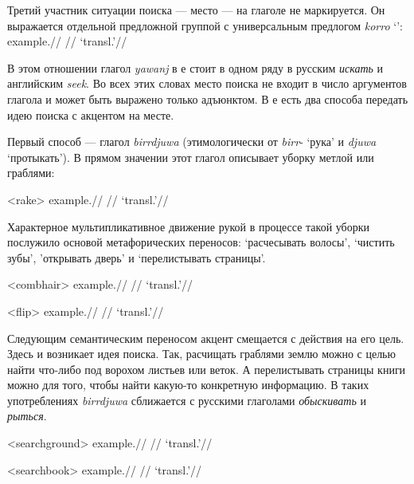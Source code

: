 
Третий участник ситуации поиска --- место --- на глаголе не маркируется. Он выражается отдельной предложной группой с универсальным предлогом \textit{korro} `\korro':
\begingl
\gla example.//
\glb //
\glft `transl.'\trailingcitation{[src]}//
\endgl\xe

В этом отношении глагол \textit{yawanj} в  е стоит в одном ряду в русским \textit{искать} и английским \textit{seek}. Во всех этих словах место поиска не входит в число аргументов глагола и может быть выражено только адъюнктом. В  е есть два способа передать идею поиска с акцентом на месте. 

Первый способ --- глагол \textit{birrdjuwa} (этимологически от \textit{birr}- `рука' и \textit{djuwa} `протыкать'). В прямом значении этот глагол описывает уборку метлой или граблями:

\ex<rake>\begingl
\gla example.//
\glb //
\glft `transl.'\trailingcitation{[src]}//
\endgl\xe

Характерное мультипликативное движение рукой в процессе такой уборки послужило основой метафорических переносов: `расчесывать волосы', `чистить зубы', 'открывать дверь' и `перелистывать страницы'.

\ex<combhair>\begingl
\gla example.//
\glb //
\glft `transl.'\trailingcitation{[src]}//
\endgl\xe

\ex<flip>\begingl
\gla example.//
\glb //
\glft `transl.'\trailingcitation{[src]}//
\endgl\xe

Следующим семантическим переносом акцент смещается с действия на его цель. Здесь и возникает идея поиска. Так, расчищать граблями землю можно с целью  найти что-либо под ворохом листьев или веток. А перелистывать страницы книги можно для того, чтобы найти какую-то конкретную информацию. В таких употреблениях \textit{birrdjuwa} сближается с русскими глаголами \textit{обыскивать} и \textit{рыться}.

\ex<searchground>\begingl
\gla example.//
\glb //
\glft `transl.'\trailingcitation{[src]}//
\endgl\xe

\ex<searchbook>\begingl
\gla example.//
\glb //
\glft `transl.'\trailingcitation{[src]}//
\endgl\xe

